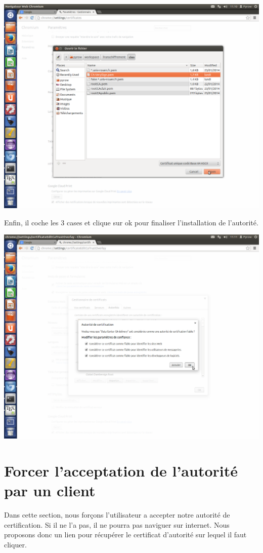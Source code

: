 \documentclass[a4paper,11pt,french]{article}
\begin{document}
\includegraphics[width=\textwidth]{images/ChromeImport.png} 
\newpage

Enfin, il coche les 3 cases et clique sur ok pour finaliser l'installation de l'autorité.

\includegraphics[width=\textwidth]{images/ChromeValide.png} 
\newpage

\section{Forcer l'acceptation de l'autorité par un client}
Dans cette section, nous forçons l'utilisateur a accepter notre autorité de certification. Si il ne l'a pas, il ne pourra pas naviguer sur internet.
Nous proposons donc un lien pour récupérer le certificat d'autorité sur lequel il faut cliquer.
\end{document}
